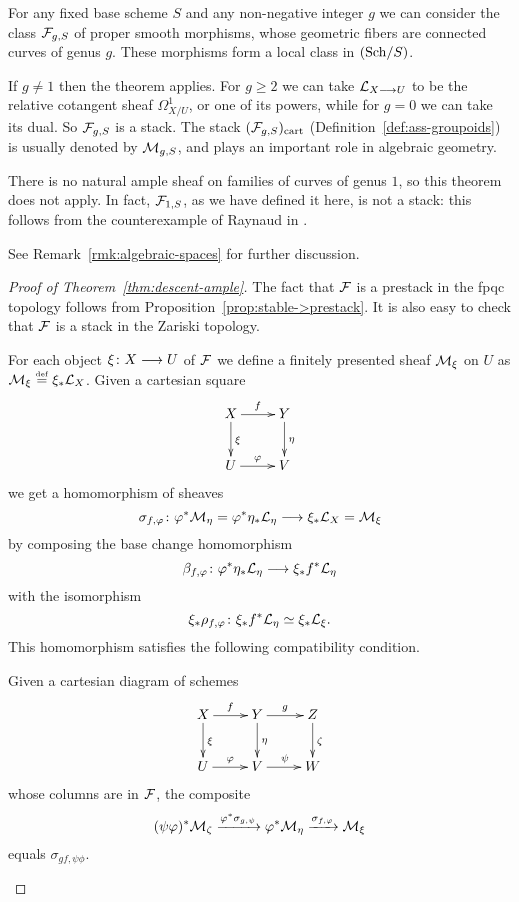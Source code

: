 \begin{4   STACKS}
\begin{4.3 Descent for morphisms of schemes}
\begin{example}\label{ex:stacks-curves}
For any fixed base scheme $S$ and any non-negative integer $g$ we can consider the class $\mathcal{F}_{g, S}$ of proper smooth morphisms, whose geometric fibers are connected curves of genus $g$. These morphisms form a local class in $({\mathrm{Sch}/S})$.

If $g \neq 1$ then the theorem applies. For $g \ge 2$ we can take $\cL_{X \arr U}$ to be the relative cotangent sheaf $\Omega^{1}_{X/U}$, or one of its powers, while for $g = 0$ we can take its dual. So $\mathcal{F}_{g, S}$ is a stack. The stack $(\mathcal{F}_{g, S})_\mathrm{cart}$ (Definition~\ref{def:ass-groupoids}) is usually denoted by $\mathcal{M}_{g, S}$, and plays an important role in algebraic geometry.

There is no natural ample sheaf on families of curves of genus $1$, so this theorem does not apply. In fact, $\mathcal{F}_{1, S}$, as we have defined it here, is not a stack: this follows from the counterexample of Raynaud in \cite[XIII~3.2]{raynaudample}.

See Remark~\ref{rmk:algebraic-spaces} for further discussion.
\end{example}




\begin{proof}[Proof of Theorem~\ref{thm:descent-ample}]

The fact that $\mathcal{F}$ is a prestack in the fpqc topology follows from Proposition~\ref{prop:stable->prestack}. It is also easy to check that $\mathcal{F}$ is a stack in the Zariski topology.

For each object $\xi \colon X \arr U$ of $\mathcal{F}$ we define a \qc finitely presented sheaf $\mathcal{M}_{\xi}$ on $U$ as $\mathcal{M}_{\xi} \overset{\mathrm{\scriptscriptstyle def}} = \xi_{*}\mathcal{L}_{X}$. Given a cartesian square
   \[
   \xymatrix{
   X \ar[r]^f \ar[d]^\xi & Y\ar[d]^\eta\\
   U \ar[r]^\phi         & V
   }
   \]
we get a homomorphism of \qc sheaves
   \[
   \sigma_{f,\phi}\colon \phi^{*}\cM_{\eta} = \phi^{*}\eta_{*}\cL_{\eta}
   \arr \xi_{*}\cL_{X} = \cM_{\xi}
   \]
by composing the base change homomorphism
   \[
   \beta_{f,\phi} \colon \phi^{*}\eta_{*}\cL_{\eta} \arr 
      \xi_{*}f^{*}\cL_{\eta}
   \]
with the isomorphism
   \[
   \xi_{*}\rho_{f,\varphi} \colon \xi_{*}f^{*}\mathcal{L}_{\eta}
      \simeq \xi_{*}\mathcal{L}_{\xi}.
   \]
This homomorphism satisfies the following compatibility condition.

\begin{proposition}\label{prop:compatibility-sigma}
Given a cartesian diagram of schemes
   \[
   \xymatrix{
   X \ar[r]^f \ar[d]^\xi & Y \ar[r]^g \ar[d]^\eta & Z \ar[d]^\zeta \\
   U \ar[r]^\phi         & V \ar[r]^\psi           & W
   }
   \]
whose columns are in $\mathcal{F}$, the composite
   \[
   (\psi\varphi)^{*}\mathcal{M}_{\zeta} \xrightarrow{\varphi^{*}\sigma_{g,\psi}}
   \varphi^{*}\mathcal{M}_{\eta} \xrightarrow{\sigma_{f,\varphi}}
   \mathcal{M}_{\xi}
   \]
equals $\sigma_{gf,\psi\phi}$.
\end{proposition}


\end{proof}
\end{4.3 Descent for morphisms of schemes}
\end{4   STACKS}
